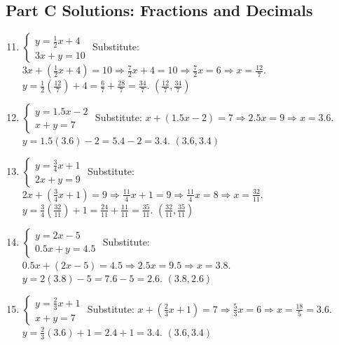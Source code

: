 \documentclass[14pt]{extarticle}
\begin{document}
\subsection*{Part C Solutions: Fractions and Decimals}
\begin{enumerate}
    \setcounter{enumi}{10}
    \item \(\begin{cases} y = \tfrac{1}{2}x + 4 \\ 3x + y = 10 \end{cases}\)  
    Substitute: \(3x + (\tfrac{1}{2}x + 4) = 10 \Rightarrow \tfrac{7}{2}x + 4 = 10 \Rightarrow \tfrac{7}{2}x = 6 \Rightarrow x = \tfrac{12}{7}\).  
    \(y = \tfrac{1}{2}(\tfrac{12}{7}) + 4 = \tfrac{6}{7} + \tfrac{28}{7} = \tfrac{34}{7}\).  
    \(\boxed{(\tfrac{12}{7}, \tfrac{34}{7})}\)

    \item \(\begin{cases} y = 1.5x - 2 \\ x + y = 7 \end{cases}\)  
    Substitute: \(x + (1.5x - 2) = 7 \Rightarrow 2.5x = 9 \Rightarrow x = 3.6\).  
    \(y = 1.5(3.6) - 2 = 5.4 - 2 = 3.4\).  
    \(\boxed{(3.6, 3.4)}\)

    \item \(\begin{cases} y = \tfrac{3}{4}x + 1 \\ 2x + y = 9 \end{cases}\)  
    Substitute: \(2x + (\tfrac{3}{4}x + 1) = 9 \Rightarrow \tfrac{11}{4}x + 1 = 9 \Rightarrow \tfrac{11}{4}x = 8 \Rightarrow x = \tfrac{32}{11}\).  
    \(y = \tfrac{3}{4}(\tfrac{32}{11}) + 1 = \tfrac{24}{11} + \tfrac{11}{11} = \tfrac{35}{11}\).  
    \(\boxed{(\tfrac{32}{11}, \tfrac{35}{11})}\)

    \item \(\begin{cases} y = 2x - 5 \\ 0.5x + y = 4.5 \end{cases}\)  
    Substitute: \(0.5x + (2x - 5) = 4.5 \Rightarrow 2.5x = 9.5 \Rightarrow x = 3.8\).  
    \(y = 2(3.8) - 5 = 7.6 - 5 = 2.6\).  
    \(\boxed{(3.8, 2.6)}\)

    \item \(\begin{cases} y = \tfrac{2}{3}x + 1 \\ x + y = 7 \end{cases}\)  
    Substitute: \(x + (\tfrac{2}{3}x + 1) = 7 \Rightarrow \tfrac{5}{3}x = 6 \Rightarrow x = \tfrac{18}{5} = 3.6\).  
    \(y = \tfrac{2}{3}(3.6) + 1 = 2.4 + 1 = 3.4\).  
    \(\boxed{(3.6, 3.4)}\)
\end{enumerate}
\end{document}
